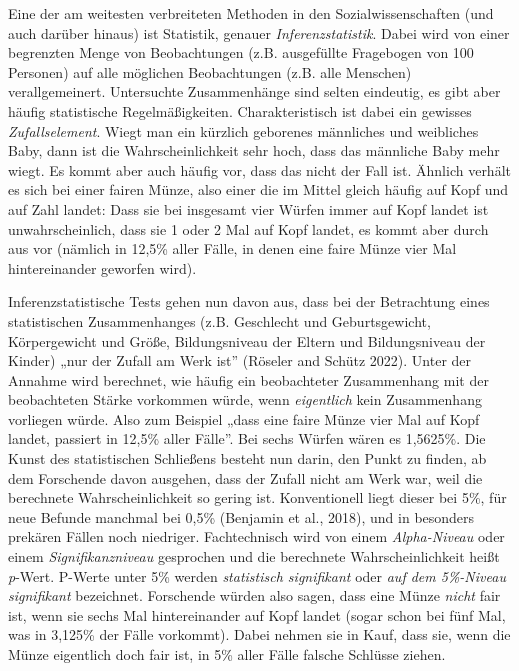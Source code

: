 \documentclass[
  letterpaper,
  DIV=11,
  numbers=noendperiod]{scrreprt}
\begin{document}
\begin{tcolorbox}[enhanced jigsaw, left=2mm, colback=white, colframe=quarto-callout-note-color-frame, opacitybacktitle=0.6, opacityback=0, title=\textcolor{quarto-callout-note-color}{\faInfo}\hspace{0.5em}{Statistische Signifikanz}, toptitle=1mm, coltitle=black, colbacktitle=quarto-callout-note-color!10!white, titlerule=0mm, bottomtitle=1mm, leftrule=.75mm, breakable, rightrule=.15mm, bottomrule=.15mm, toprule=.15mm, arc=.35mm]

Eine der am weitesten verbreiteten Methoden in den Sozialwissenschaften
(und auch darüber hinaus) ist Statistik, genauer
\emph{Inferenzstatistik}. Dabei wird von einer begrenzten Menge von
Beobachtungen (z.B. ausgefüllte Fragebogen von 100 Personen) auf alle
möglichen Beobachtungen (z.B. alle Menschen) verallgemeinert.
Untersuchte Zusammenhänge sind selten eindeutig, es gibt aber häufig
statistische Regelmäßigkeiten. Charakteristisch ist dabei ein gewisses
\emph{Zufallselement}. Wiegt man ein kürzlich geborenes männliches und
weibliches Baby, dann ist die Wahrscheinlichkeit sehr hoch, dass das
männliche Baby mehr wiegt. Es kommt aber auch häufig vor, dass das nicht
der Fall ist. Ähnlich verhält es sich bei einer fairen Münze, also einer
die im Mittel gleich häufig auf Kopf und auf Zahl landet: Dass sie bei
insgesamt vier Würfen immer auf Kopf landet ist unwahrscheinlich, dass
sie 1 oder 2 Mal auf Kopf landet, es kommt aber durch aus vor (nämlich
in 12,5\% aller Fälle, in denen eine faire Münze vier Mal hintereinander
geworfen wird).

Inferenzstatistische Tests gehen nun davon aus, dass bei der Betrachtung
eines statistischen Zusammenhanges (z.B. Geschlecht und Geburtsgewicht,
Körpergewicht und Größe, Bildungsniveau der Eltern und Bildungsniveau
der Kinder) „nur der Zufall am Werk ist'' (Röseler and Schütz 2022).
Unter der Annahme wird berechnet, wie häufig ein beobachteter
Zusammenhang mit der beobachteten Stärke vorkommen würde, wenn
\emph{eigentlich} kein Zusammenhang vorliegen würde. Also zum Beispiel
„dass eine faire Münze vier Mal auf Kopf landet, passiert in 12,5\%
aller Fälle''. Bei sechs Würfen wären es 1,5625\%. Die Kunst des
statistischen Schließens besteht nun darin, den Punkt zu finden, ab dem
Forschende davon ausgehen, dass der Zufall nicht am Werk war, weil die
berechnete Wahrscheinlichkeit so gering ist. Konventionell liegt dieser
bei 5\%, für neue Befunde manchmal bei 0,5\% (Benjamin et al., 2018),
und in besonders prekären Fällen noch niedriger. Fachtechnisch wird von
einem \emph{Alpha-Niveau} oder einem \emph{Signifikanzniveau} gesprochen
und die berechnete Wahrscheinlichkeit heißt \emph{p}-Wert. P-Werte unter
5\% werden \emph{statistisch signifikant} oder \emph{auf dem 5\%-Niveau
signifikant} bezeichnet. Forschende würden also sagen, dass eine Münze
\emph{nicht} fair ist, wenn sie sechs Mal hintereinander auf Kopf landet
(sogar schon bei fünf Mal, was in 3,125\% der Fälle vorkommt). Dabei
nehmen sie in Kauf, dass sie, wenn die Münze eigentlich doch fair ist,
in 5\% aller Fälle falsche Schlüsse ziehen.


\end{tcolorbox}
\end{document}
